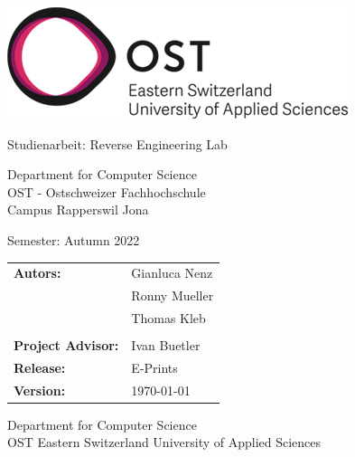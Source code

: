 \begin{titlepage}

    \begin{center}

        \includegraphics[height=0.15\textwidth, right]{resources/ost-logo.png}

        \vspace{1 cm}


        \vspace{0.5cm}

        {\Huge Studienarbeit: Reverse Engineering Lab}

        \vspace{0.5cm}

        

        \vspace{1 cm}

        Department for Computer Science \\
        OST - Ostschweizer Fachhochschule \\
        Campus Rapperswil Jona \\

        \vspace{1 cm}

        Semester: Autumn 2022

        \vspace{1 cm}
        
        \begin{table}[h!]
            \centering
            \begin{tabular}{@{}ll}
                \textbf{Autors:}    & Gianluca Nenz \\
                                          & Ronny Mueller \\
                                          & Thomas Kleb \\
                                          &                    \\
                \textbf{Project Advisor:} & Ivan Buetler \\
                \textbf{Release:} & E-Prints \\
                \textbf{Version:} & \today
            \end{tabular}
        \end{table}
        

        \vfill


        \vspace{1cm}
        Department for Computer Science\\
        OST Eastern Switzerland University of Applied Sciences

    \end{center}

\end{titlepage}
